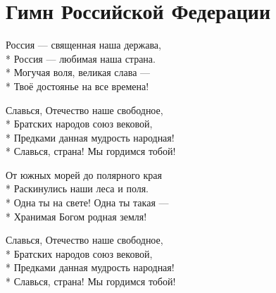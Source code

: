 \vspace{\fill}\newpage

\section{Гимн Российской Федерации}
\label{song:Гимн_Российской_Федерации}

\medskip

\begin{minipage}{\linewidth}
Россия — священная наша держава,\\*
Россия — любимая наша страна.\\*
Могучая воля, великая слава —\\*
Твоё достоянье на все времена!\\
\end{minipage}\par\medskip\nobreak

\medskip

\begin{minipage}{\linewidth}
\hspace*{1.5em}Славься, Отечество наше свободное,\\*
\hspace*{1.5em}Братских народов союз вековой,\\*
\hspace*{1.5em}Предками данная мудрость народная!\\*
\hspace*{1.5em}Славься, страна! Мы гордимся тобой!\\
\end{minipage}\par\medskip\nobreak

\medskip

\begin{minipage}{\linewidth}
От южных морей до полярного края\\*
Раскинулись наши леса и поля.\\*
Одна ты на свете! Одна ты такая —\\*
Хранимая Богом родная земля!\\
\end{minipage}\par\medskip\nobreak

\medskip

\begin{minipage}{\linewidth}
\hspace*{1.5em}Славься, Отечество наше свободное,\\*
\hspace*{1.5em}Братских народов союз вековой,\\*
\hspace*{1.5em}Предками данная мудрость народная!\\*
\hspace*{1.5em}Славься, страна! Мы гордимся тобой!\\
\end{minipage}\par\medskip\nobreak

